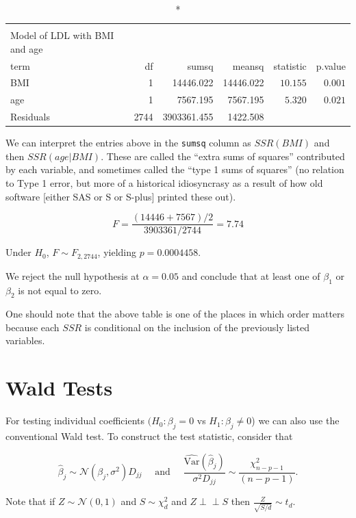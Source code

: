 \documentclass[
  letterpaper,
  DIV=11,
  numbers=noendperiod]{scrreport}
\begin{document}
\begin{longtable}{lrrrrr}
\caption*{
{\large \textbf{Overall test}} \\ 
{\small Model of LDL with BMI and age}
} \\ 
\toprule
term & df & sumsq & meansq & statistic & p.value \\ 
\midrule
BMI & 1 & 14446.022 & 14446.022 & $10.155$ & $0.001$ \\ 
age & 1 & 7567.195 & 7567.195 & $5.320$ & $0.021$ \\ 
Residuals & 2744 & 3903361.455 & 1422.508 &  &  \\ 
\bottomrule
\end{longtable}

We can interpret the entries above in the \texttt{sumsq} column as
\(SSR(BMI)\) and then \(SSR(age|BMI)\). These are called the ``extra
sums of squares'' contributed by each variable, and sometimes called the
``type 1 sums of squares'' (no relation to Type 1 error, but more of a
historical idiosyncrasy as a result of how old software {[}either SAS or
S or S-plus{]} printed these out).

\[F = \frac{(14446 + 7567)/2}{3903361/2744} = 7.74\]

Under \(H_0\), \(F \sim F_{2, 2744}\), yielding \(p = 0.0004458\).

We reject the null hypothesis at \(\alpha = 0.05\) and conclude that at
least one of \(\beta_1\) or \(\beta_2\) is not equal to zero.

One should note that the above table is one of the places in which order
matters because each \(SSR\) is conditional on the inclusion of the
previously listed variables.

\hypertarget{wald-tests}{%
\section{Wald Tests}\label{wald-tests}}

For testing individual coefficients \((H_0: \beta_j = 0\) vs
\(H_1: \beta_j \neq 0\)) we can also use the conventional Wald test. To
construct the test statistic, consider that

\[\hat \beta_j \sim \mathcal N(\beta_j, \sigma^2) D_{jj} \quad \text{ and } \quad 
\frac{\hat{\text{Var}} (\hat \beta_j)}{\sigma^2 D_{jj}} \sim \frac{\chi^2_{n-p-1}}{(n-p-1)}.\]

Note that if \(Z \sim \mathcal N(0,1)\) and \(S \sim \chi^2_d\) and
\(Z \perp\!\!\!\perp S\) then \(\frac{Z}{\sqrt{S/d}} \sim t_d\).
\end{document}
